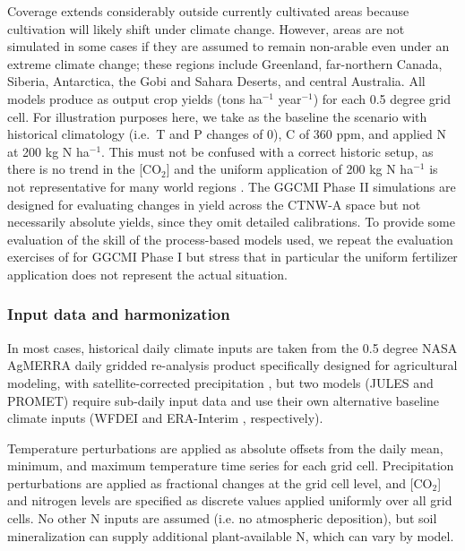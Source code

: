 \documentclass[gmd, manuscript]{copernicus} %
\begin{document}
Coverage extends considerably outside currently cultivated areas because cultivation will likely shift under climate change.  
However, areas are not simulated in some cases if they are assumed to remain non-arable even under an extreme climate change; these regions include Greenland, far-northern Canada, Siberia, Antarctica, the Gobi and Sahara Deserts, and central Australia. 
All models produce as output crop yields (tons ha$^{-1}$ year$^{-1}$) for each 0.5 degree grid cell. 
For illustration purposes here, we take as the baseline the scenario with historical climatology (i.e.\ T and P changes of 0), C of 360 ppm, and applied N at 200 kg N ha$^{-1}$. 
This must not be confused with a correct historic setup, as there is no trend in the [CO$_2$] and the uniform application of 200 kg N ha$^{-1}$ is not representative for many world regions \citep{Elliott2015}.
The GGCMI Phase II simulations are designed for evaluating changes in yield across the CTNW-A space but not necessarily absolute yields, since they omit detailed calibrations. 
To provide some evaluation of the skill of the process-based models used, we repeat the evaluation exercises of \citet{muller_global_2017} for GGCMI Phase I but stress that in particular the uniform fertilizer application does not represent the actual situation.

\subsubsection{Input data and harmonization}

In most cases, historical daily climate inputs are taken from the 0.5 degree NASA AgMERRA daily gridded re-analysis product specifically designed for agricultural modeling, with satellite-corrected precipitation \citep{Ruane2015}, but two models (JULES and PROMET) require sub-daily input data and use their own alternative baseline climate inputs (WFDEI \citep{weedon2014wfdei} and ERA-Interim \citep{dee2011era}, respectively). 

Temperature perturbations are applied as absolute offsets from the daily mean, minimum, and maximum temperature time series for each grid cell.
Precipitation perturbations are applied as fractional changes at the grid cell level, and [CO$_2$] and nitrogen levels are specified as discrete values applied uniformly over all grid cells. 
No other N inputs are assumed (i.e. no atmospheric deposition), but soil mineralization can supply additional plant-available N, which can vary by model. 
\end{document}
